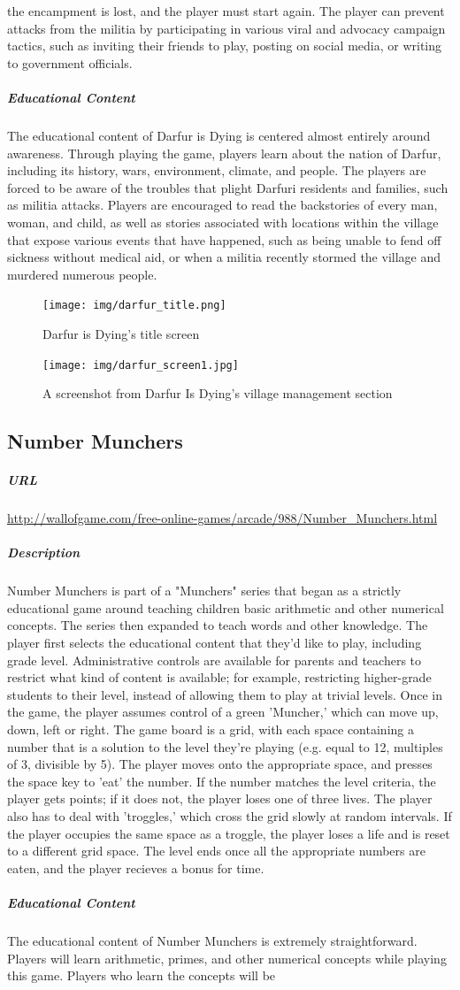 the encampment is lost, and the player must start again. The player can prevent attacks from the militia by participating in various viral and advocacy campaign tactics, such as inviting their friends to play, posting on social media, or writing to government officials.\subparagraph{Educational Content}The educational content of Darfur is Dying is centered almost entirely around awareness. Through playing the game, players learn about the nation of Darfur, including its history, wars, environment, climate, and people. The players are forced to be aware of the troubles that plight Darfuri residents and families, such as militia attacks. Players are encouraged to read the backstories of every man, woman, and child, as well as stories associated with locations within the village that expose various events that have happened, such as being unable to fend off sickness without medical aid, or when a militia recently stormed the village and murdered numerous people.\begin{figure}[h!]\centering \texttt{[image: img/darfur\_title.png]}\caption{Darfur is Dying's title screen}\end{figure}\begin{figure}[h!]\centering \texttt{[image: img/darfur\_screen1.jpg]}\caption{A screenshot from Darfur Is Dying's village management section}\end{figure}\newpage\subsection{Number Munchers}\subparagraph{URL}\url{http://wallofgame.com/free-online-games/arcade/988/Number_Munchers.html}\subparagraph{Description}Number Munchers is part of a "Munchers" series that began as a strictly educational game around teaching children basic arithmetic and other numerical concepts. The series then expanded to teach words and other knowledge. The player first selects the educational content that they'd like to play, including grade level. Administrative controls are available for parents and teachers to restrict what kind of content is available; for example, restricting higher-grade students to their level, instead of allowing them to play at trivial levels. Once in the game, the player assumes control of a green 'Muncher,' which can move up, down, left or right. The game board is a grid, with each space containing a number that is a solution to the level they're playing (e.g. equal to 12, multiples of 3, divisible by 5). The player moves onto the appropriate space, and presses the space key to 'eat' the number. If the number matches the level criteria, the player gets points; if it does not, the player loses one of three lives. The player also has to deal with 'troggles,' which cross the grid slowly at random intervals. If the player occupies the same space as a troggle, the player loses a life and is reset to a different grid space. The level ends once all the appropriate numbers are eaten, and the player recieves a bonus for time.\subparagraph{Educational Content}The educational content of Number Munchers is extremely straightforward. Players will learn arithmetic, primes, and other numerical concepts while playing this game. Players who learn the concepts will be 